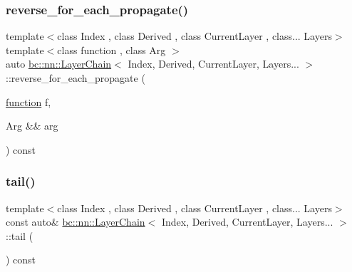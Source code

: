 \subsubsection{\texorpdfstring{reverse\+\_\+for\+\_\+each\+\_\+propagate()}{reverse\_for\_each\_propagate()}\hspace{0.1cm}{\footnotesize\ttfamily [2/2]}}
{\footnotesize\ttfamily template$<$class Index , class Derived , class Current\+Layer , class... Layers$>$ \\
template$<$class function , class Arg $>$ \\
auto \hyperlink{structbc_1_1nn_1_1LayerChain}{bc\+::nn\+::\+Layer\+Chain}$<$ Index, Derived, Current\+Layer, Layers... $>$\+::reverse\+\_\+for\+\_\+each\+\_\+propagate (\begin{DoxyParamCaption}\item[{\hyperlink{namespacebc_1_1nn_a0fef36d0002a6d7c7cb619d7e27d5c1e}{function}}]{f,  }\item[{Arg \&\&}]{arg }\end{DoxyParamCaption}) const\hspace{0.3cm}{\ttfamily [inline]}}

\mbox{\label{structbc_1_1nn_1_1LayerChain_3_01Index_00_01Derived_00_01CurrentLayer_00_01Layers_8_8_8_01_4_a3a05238fc0d791091e1becb507a20880}} 
\subsubsection{\texorpdfstring{tail()}{tail()}\hspace{0.1cm}{\footnotesize\ttfamily [1/2]}}
{\footnotesize\ttfamily template$<$class Index , class Derived , class Current\+Layer , class... Layers$>$ \\
const auto\& \hyperlink{structbc_1_1nn_1_1LayerChain}{bc\+::nn\+::\+Layer\+Chain}$<$ Index, Derived, Current\+Layer, Layers... $>$\+::tail (\begin{DoxyParamCaption}{ }\end{DoxyParamCaption}) const\hspace{0.3cm}{\ttfamily [inline]}}

